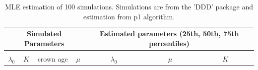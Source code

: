 \documentclass[]{article}
\begin{document}
\begin{table}[h!]
\centering

\caption{MLE estimation of 100 simulations. Simulations are from the 'DDD' package and estimation from p1 algorithm.}
\label{ddd}
\begin{tabular}{cccc|ccc@{\hskip 0.3in}ccc@{\hskip 0.3in}ccc}
\hline
\multicolumn{4}{c}{Simulated Parameters} & \multicolumn{9}{c}{Estimated parameters (25th, 50th, 75th percentiles)} \\ \hline
        &       &              &        &         &       &       &        &       &       &       &       &       \\
$\lambda_0$     & $K$     & crown age    & $\mu$     &   &  $\lambda_0$     &       &      &  $\mu$     &       &      &  $K$     &       \\
   

\end{tabular}
\end{table}
\end{document}
